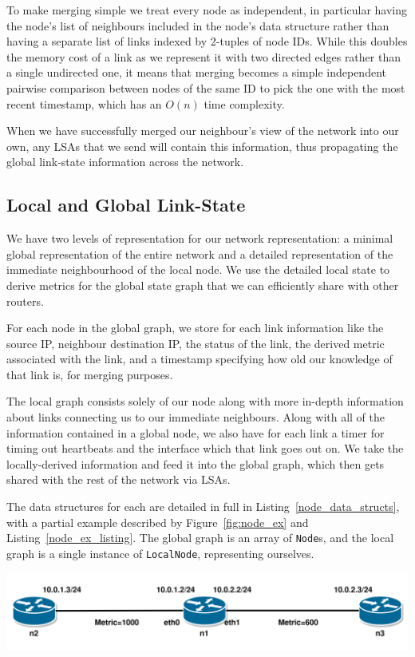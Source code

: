\documentclass[withindex,glossary,openany]{cam-thesis}
\begin{document}
To make merging simple we treat every node as independent, in particular having the node's list of neighbours included in the node's data structure rather than having a separate list of links indexed by 2-tuples of node IDs. While this doubles the memory cost of a link as we represent it with two directed edges rather than a single undirected one, it means that merging becomes a simple independent pairwise comparison between nodes of the same ID to pick the one with the most recent timestamp, which has an $O(n)$ time complexity.

When we have successfully merged our neighbour's view of the network into our own, any LSAs that we send will contain this information, thus propagating the global link-state information across the network.

\subsection{Local and Global Link-State}

We have two levels of representation for our network representation: a minimal global representation of the entire network and a detailed representation of the immediate neighbourhood of the local node. We use the detailed local state to derive metrics for the global state graph that we can efficiently share with other routers.

For each node in the global graph, we store for each link information like the source IP, neighbour destination IP, the status of the link, the derived metric associated with the link, and a timestamp specifying how old our knowledge of that link is, for merging purposes.

The local graph consists solely of our node along with more in-depth information about links connecting us to our immediate neighbours. Along with all of the information contained in a global node, we also have for each link a timer for timing out heartbeats and the interface which that link goes out on. We take the locally-derived information and feed it into the global graph, which then gets shared with the rest of the network via LSAs.

The data structures for each are detailed in full in Listing~\ref{node_data_structs}, with a partial example described by Figure~\ref{fig:node_ex} and Listing~\ref{node_ex_listing}. The global graph is an array of \texttt{Node}s, and the local graph is a single instance of \texttt{LocalNode}, representing ourselves.

\begin{center}
\begin{minipage}{0.9\textwidth} \centering
	\includegraphics[width=1\textwidth]{node}
	\label{fig:node_ex}
\end{minipage}
\end{center}
\end{document}
